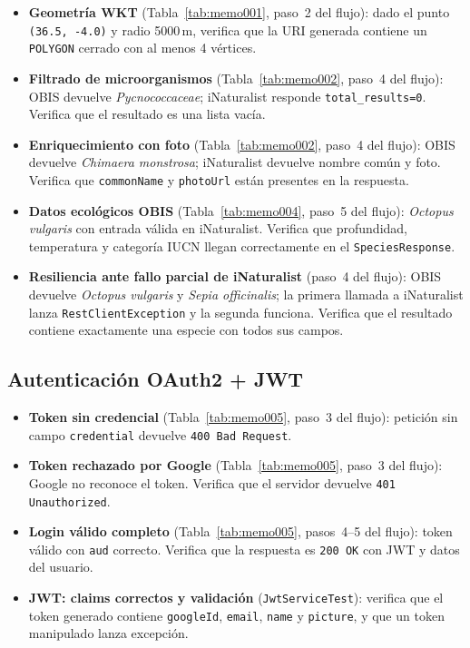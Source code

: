 \begin{itemize}
    \item \textbf{Geometría WKT} (Tabla~\ref{tab:memo001}, paso~2 del flujo): dado el punto \texttt{(36.5,\,-4.0)} y radio 5000\,m, verifica que la URI generada contiene un \texttt{POLYGON} cerrado con al menos 4 vértices.

    \item \textbf{Filtrado de microorganismos} (Tabla~\ref{tab:memo002}, paso~4 del flujo): OBIS devuelve \textit{Pycnococcaceae}; iNaturalist responde \texttt{total\_results=0}. Verifica que el resultado es una lista vacía.

    \item \textbf{Enriquecimiento con foto} (Tabla~\ref{tab:memo002}, paso~4 del flujo): OBIS devuelve \textit{Chimaera monstrosa}; iNaturalist devuelve nombre común y foto. Verifica que \texttt{commonName} y \texttt{photoUrl} están presentes en la respuesta.

    \item \textbf{Datos ecológicos OBIS} (Tabla~\ref{tab:memo004}, paso~5 del flujo): \textit{Octopus vulgaris} con entrada válida en iNaturalist. Verifica que profundidad, temperatura y categoría IUCN llegan correctamente en el \texttt{SpeciesResponse}.

    \item \textbf{Resiliencia ante fallo parcial de iNaturalist} (paso~4 del flujo): OBIS devuelve \textit{Octopus vulgaris} y \textit{Sepia officinalis}; la primera llamada a iNaturalist lanza \texttt{RestClientException} y la segunda funciona. Verifica que el resultado contiene exactamente una especie con todos sus campos.
\end{itemize}

\subsection*{Autenticación OAuth2 + JWT}

\begin{itemize}
    \item \textbf{Token sin credencial} (Tabla~\ref{tab:memo005}, paso~3 del flujo): petición sin campo \texttt{credential} devuelve \texttt{400 Bad Request}.

    \item \textbf{Token rechazado por Google} (Tabla~\ref{tab:memo005}, paso~3 del flujo): Google no reconoce el token. Verifica que el servidor devuelve \texttt{401 Unauthorized}.

    \item \textbf{Login válido completo} (Tabla~\ref{tab:memo005}, pasos~4--5 del flujo): token válido con \texttt{aud} correcto. Verifica que la respuesta es \texttt{200 OK} con JWT y datos del usuario.

    \item \textbf{JWT: claims correctos y validación} (\texttt{JwtServiceTest}): verifica que el token generado contiene \texttt{googleId}, \texttt{email}, \texttt{name} y \texttt{picture}, y que un token manipulado lanza excepción.
\end{itemize}

